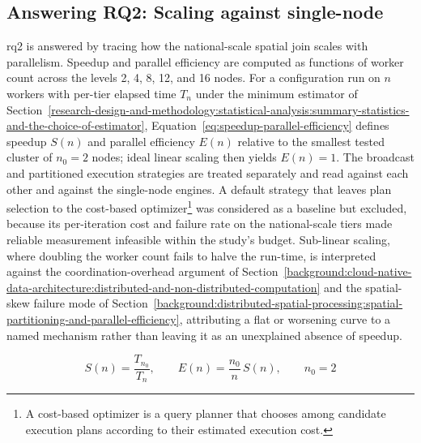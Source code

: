 \subsection{Answering RQ2: Scaling against single-node}
\label{research-design-and-methodology:statistical-analysis:answering-rq2-scaling-against-single-node}
\acrshort{rq}2 is answered by tracing how the national-scale spatial join scales with parallelism. Speedup and parallel efficiency are computed as functions of worker count across the levels \num{2}, \num{4}, \num{8}, \num{12}, and \num{16} nodes. For a configuration run on \(n\) workers with per-tier elapsed time \(T_n\) under the minimum estimator of Section~\ref{research-design-and-methodology:statistical-analysis:summary-statistics-and-the-choice-of-estimator}, Equation~\ref{eq:speedup-parallel-efficiency} defines speedup \(S(n)\) and parallel efficiency \(E(n)\) relative to the smallest tested cluster of \(n_0 = 2\) nodes; ideal linear scaling then yields \(E(n) = 1\). The broadcast and partitioned execution strategies are treated separately and read against each other and against the single-node engines. A default strategy that leaves plan selection to the cost-based optimizer\footnote{A cost-based optimizer is a query planner that chooses among candidate execution plans according to their estimated execution cost.} was considered as a baseline but excluded, because its per-iteration cost and failure rate on the national-scale tiers made reliable measurement infeasible within the study's budget. Sub-linear scaling, where doubling the worker count fails to halve the run-time, is interpreted against the coordination-overhead argument of Section~\ref{background:cloud-native-data-architecture:distributed-and-non-distributed-computation} and the spatial-skew failure mode of Section~\ref{background:distributed-spatial-processing:spatial-partitioning-and-parallel-efficiency}, attributing a flat or worsening curve to a named mechanism rather than leaving it as an unexplained absence of speedup.

\begin{equation}
	S(n) = \frac{T_{n_0}}{T_n}, \qquad E(n) = \frac{n_0}{n}\,S(n), \qquad n_0 = 2
	\label{eq:speedup-parallel-efficiency}
\end{equation}

